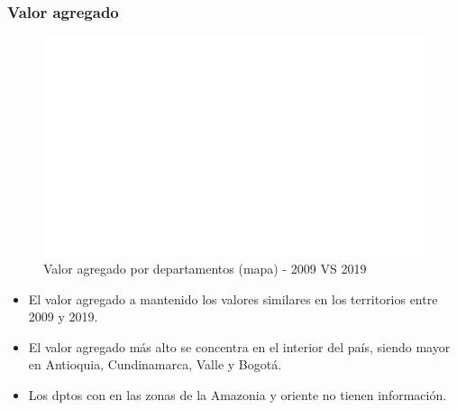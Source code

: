         \subsubsection{Valor agregado}

    \begin{figure}[H]
        \caption{Valor agregado por departamentos (mapa) - 2009 VS 2019 \label{map_result_2} }
        \begin{center}
        \includegraphics[width=\textwidth,keepaspectratio]{img/var_226_map.png}
        \end{center}
    \end{figure}
            \begin{itemize}
                    \item El valor agregado a mantenido los valores similares en los territorios entre 2009 y 2019.
                    \item El valor agregado más alto se concentra en el interior del país, siendo mayor en Antioquia, Cundinamarca, Valle y Bogotá.
                    \item Los dptos con en las zonas de la Amazonia y oriente no tienen información.
                    \end{itemize}

